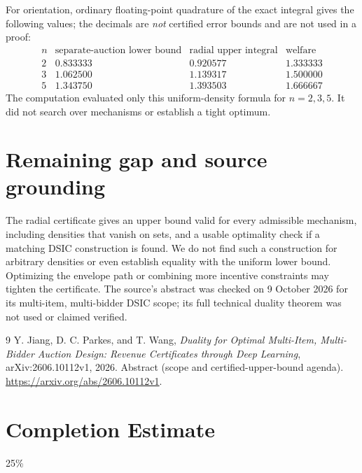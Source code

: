 \documentclass[11pt]{article}
\theoremstyle{definition}
\begin{document}
For orientation, ordinary floating-point quadrature of the exact integral
gives the following values; the decimals are \emph{not} certified error
bounds and are not used in a proof:
\[
\begin{array}{c|ccc}
 n&\text{separate-auction lower bound}&\text{radial upper integral}&\text{welfare}\\\hline
 2&0.833333&0.920577&1.333333\\
 3&1.062500&1.139317&1.500000\\
 5&1.343750&1.393503&1.666667
\end{array}
\]
The computation evaluated only this uniform-density formula for $n=2,3,5$.
It did not search over mechanisms or establish a tight optimum.

\section{Remaining gap and source grounding}
The radial certificate gives an upper bound valid for every admissible
mechanism, including densities that vanish on sets, and a usable optimality
check if a matching DSIC construction is found. We do not find such a
construction for arbitrary densities or even establish equality with the
uniform lower bound. Optimizing the envelope path or combining more
incentive constraints may tighten the certificate. The source's abstract
was checked on 9 October 2026 for its multi-item, multi-bidder DSIC scope;
its full technical duality theorem was not used or claimed verified.
\begin{thebibliography}{9}
 Y. Jiang, D. C. Parkes, and T. Wang,
\emph{Duality for Optimal Multi-Item, Multi-Bidder Auction Design:
Revenue Certificates through Deep Learning}, arXiv:2606.10112v1, 2026.
Abstract (scope and certified-upper-bound agenda).
\url{https://arxiv.org/abs/2606.10112v1}.
\end{thebibliography}

\section{Completion Estimate}
25\%
\end{document}
